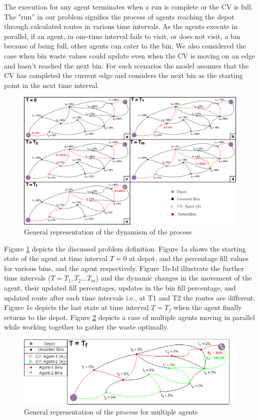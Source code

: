 \documentclass[12pt]{article}
\begin{document}
The execution for any agent terminates when a run is complete or the CV is full. The "run” in our problem signifies the process of agents reaching the depot through calculated routes in various time intervals. As the agents execute in parallel, if an agent, in one-time interval fails to visit, or does not visit, a bin because of being full, other agents can cater to the bin. We also considered the case when bin waste values could update even when the CV is moving on an edge and hasn't reached the next bin. For such scenarios the model assumes that the CV has completed the current edge and considers the next bin as the starting point in the next time interval.  

\begin{figure}[H]
    \centering
    \includegraphics[scale=0.55]{Figure 1.png}
    \caption{General representation of the dynamism of the process}\label{fige}
\end{figure}


Figure \ref{fige} depicts the discussed problem definition. Figure 1a shows the starting state of the agent at time interval $T=0$ at depot, and the percentage fill values for various bins, and the agent respectively. Figure 1b-1d illustrate the further time intervals ($T=T_1,T_2...T_m$) and the dynamic changes in the movement of the agent, their updated fill percentages, updates in the bin fill percentage, and updated route after each time intervals i.e., at T1 and T2 the routes are different. Figure 1e depicts the last state at time interval $T=T_f$ when the agent finally returns to the depot. Figure \ref{fige2} depicts a case of multiple agents moving in parallel while working together to gather the waste optimally.  

\begin{figure}[H]
    \centering
    \includegraphics[scale=0.6]{Figure 2.png}
    \caption{General representation of the process for multiple agents}\label{fige2}
\end{figure}
\end{document}
